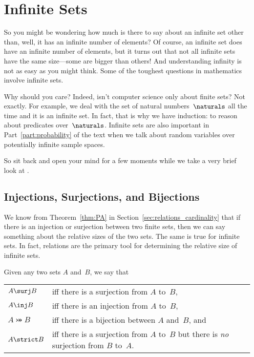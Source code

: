 \chapter{Infinite Sets}\label{cardinality_chap}

So you might be wondering how much is there to say about an infinite
set other than, well, it has an infinite number of elements?  Of
course, an infinite set does have an infinite number of elements, but
it turns out that not all infinite sets have the same size---some are
bigger than others!  And understanding infinity is not as easy as you
might think.  Some of the toughest questions in mathematics involve
infinite sets.

Why should you care?  Indeed, isn't computer science only about finite
sets?  Not exactly.  For example, we deal with the set of natural
numbers~$\naturals$ all the time and it is an infinite set.  In fact,
that is why we have induction: to reason about predicates
over~$\naturals$.  Infinite sets are also important in
Part~\ref{part:probability} of the text when we talk about random
variables over potentially infinite sample spaces.

So sit back and open your mind for a few moments while we take a very
brief look at .

\section{Injections, Surjections, and Bijections}

We know from Theorem~\ref{thm:PA} in
Section~\ref{sec:relations_cardinality} that if there is an injection
or surjection between two finite sets, then we can say something about
the relative sizes of the two sets.  The same is true for infinite
sets.  In fact, relations are the primary tool for determining the
relative size of infinite sets.

\begin{definition}
Given any two sets $A$ and~$B$, we say that
\begin{center}
\begin{tabular}{lp{3in}}
$A \surj B$     & iff there is a surjection from $A$ to~$B$, \\

$A \inj B$      & iff there is an injection from $A$ to~$B$, \\

$A \bij B$      & iff there is a bijection between $A$ and~$B$, and \\

$A \strict B$   & iff there is a surjection from $A$ to~$B$ but
  there is \emph{no} surjection from $B$ to~$A$.
\end{tabular}
\end{center}
\end{definition}

